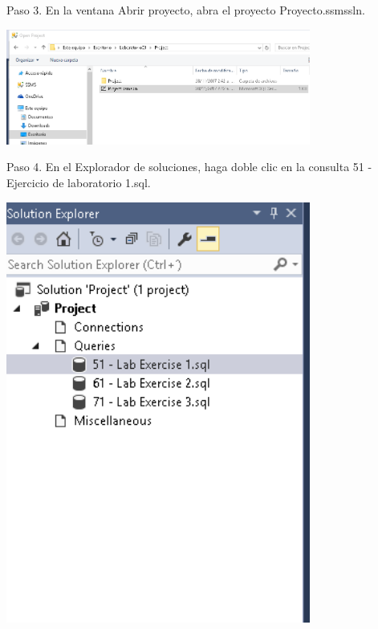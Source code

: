 \begin{flushleft}
\textbf{}\\
\textbf{}\\
\textbf{}\\
\textbf{}\\
\textbf{}\\
\textbf{}\\
\textbf{}\\
\textbf{}\\
\textbf{}\\
Paso 3. En la ventana Abrir proyecto, abra el proyecto Proyecto.ssmssln.
\begin{center}
	\includegraphics[width=10cm]{./Imagenes/img3} 
	\end{center}

Paso 4. En el Explorador de soluciones, haga doble clic en la consulta 51 - Ejercicio de laboratorio 1.sql.
\begin{center}
	\includegraphics[width=10cm]{./Imagenes/img4} 
	\end{center}
\textbf{}\\
\textbf{}\\
\textbf{}\\


\end{flushleft}
